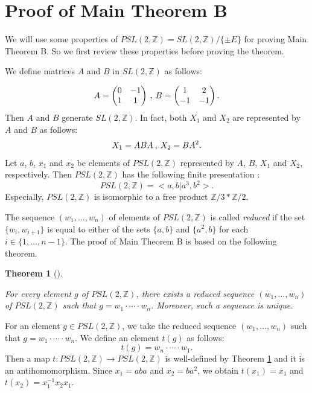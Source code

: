 \documentclass{amsart}
\theoremstyle{plain}
\newtheorem{thm}{Theorem}[section]
\theoremstyle{definition}
\begin{document}
\section{Proof of Main Theorem B}

We will use some properties of $PSL(2,\mathbb{Z})=SL(2,\mathbb{Z})/\{\pm E\}$ for proving Main Theorem B. 
So we first review these properties before proving the theorem. 

\par

We define matrices $A$ and $B$ in $SL(2,\mathbb{Z})$ as follows: 

\[
A=
\begin{pmatrix}
0 & -1 \\
1 & 1 
\end{pmatrix}
\hspace{.2em},\hspace{.2em}
B=
\begin{pmatrix}
1 & 2 \\
-1 & -1 
\end{pmatrix}.
\]
Then $A$ and $B$ generate $SL(2,\mathbb{Z})$. 
In fact, both $X_1$ and $X_2$ are represented by $A$ and $B$ as follows: 
\[
X_1=ABA\hspace{.2em},\hspace{.2em}X_2=BA^2. 
\]
Let $a$, $b$, $x_1$ and $x_2$ be elements of $PSL(2,\mathbb{Z})$ represented by $A$, $B$, $X_1$ and $X_2$, respectively. 
Then $PSL(2,\mathbb{Z})$ has the following finite presentation \cite{MKS}: 
\[
PSL(2,\mathbb{Z})=<a,b|a^3,b^2>. 
\]
Especially, $PSL(2,\mathbb{Z})$ is isomorphic to a free product $\mathbb{Z}/3\ast\mathbb{Z}/2$. 

\par

The sequence $(w_1,\ldots,w_n)$ of elements of $PSL(2,\mathbb{Z})$ is called {\it reduced} 
if the set $\{w_i,w_{i+1}\}$ is equal to either of the sets $\{a,b\}$ and $\{a^2,b\}$ for each $i\in\{1,\ldots,n-1\}$. 
The proof of Main Theorem B is based on the following theorem. 

\begin{thm}[\cite{MKS}]\label{key thm of B}

For every element $g$ of $PSL(2,\mathbb{Z})$, there exists a reduced sequence $(w_1,\ldots,w_n)$ of $PSL(2,\mathbb{Z})$ such that $g=w_1\cdot\cdots\cdot w_n$. 
Moreover, such a sequence is unique. 

\end{thm}

For an element $g\in PSL(2,\mathbb{Z})$, we take the reduced sequence $(w_1,\ldots,w_n)$ such that $g=w_1\cdot\cdots\cdot w_n$. 
We define an element $t(g)$ as follows: 
\[
t(g)=w_n\cdot\cdots\cdot w_1. 
\]
Then a map $t:PSL(2,\mathbb{Z})\rightarrow PSL(2,\mathbb{Z})$ is well-defined by Theorem \ref{key thm of B} and it is an antihomomorphism. 
Since $x_1=aba$ and $x_2=ba^2$, we obtain $t(x_1)=x_1$ and $t(x_2)=x_1^{-1}x_2x_1$. 
\end{document}
